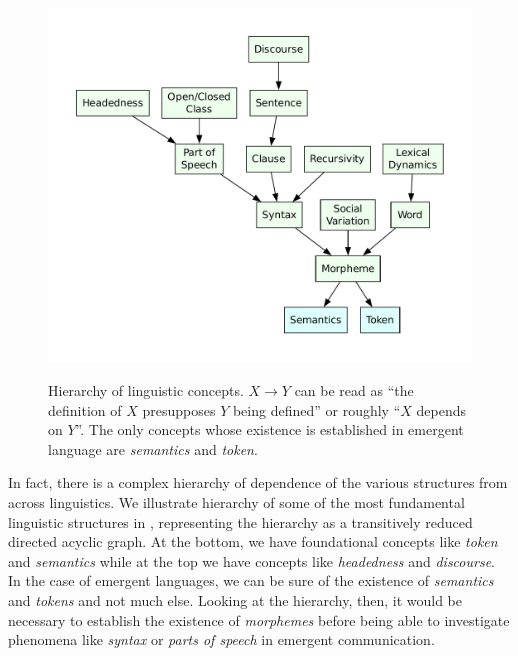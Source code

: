 \begin{figure}
  \centering
  \includegraphics[width=0.95\linewidth]{assets/linguistic-dag}
  \caption{%
    Hierarchy of linguistic concepts.
    $X\rightarrow Y$ can be read as ``the definition of $X$ presupposes $Y$ being defined'' or roughly ``$X$ depends on $Y$''.
    The only concepts whose existence is established in emergent language are \emph{semantics} and \emph{token}.}
  \unskip\label{fig:linguistic-dag}
\end{figure}

In fact, there is a complex hierarchy of dependence of the various structures from across linguistics.
We illustrate hierarchy of some of the most fundamental linguistic structures in , representing the hierarchy as a transitively reduced directed acyclic graph.
At the bottom, we have foundational concepts like \emph{token} and \emph{semantics} while at the top we have concepts like \emph{headedness} and \emph{discourse}.
In the case of emergent languages, we can be sure of the existence of \emph{semantics} and \emph{tokens} and not much else.
Looking at the hierarchy, then, it would be necessary to establish the existence of \emph{morphemes} before being able to investigate phenomena like \emph{syntax} or \emph{parts of speech} in emergent communication.





